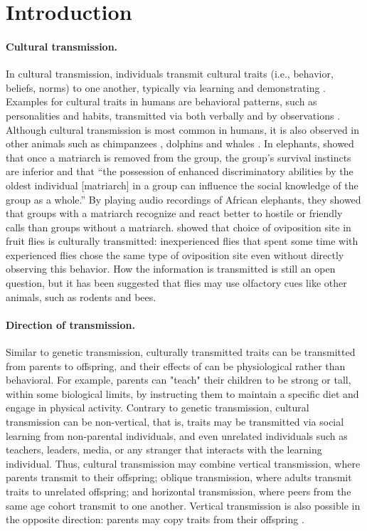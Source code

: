 \documentclass[12pt]{extarticle}
\begin{document}
\tableofcontents

\pagebreak

\section{Introduction}

\paragraph{Cultural transmission.}
In cultural transmission, individuals transmit cultural traits (i.e., behavior, beliefs, norms) to one another, typically via learning and demonstrating \citep{transmissionVectorsBook}.
Examples for cultural traits in humans are behavioral patterns, such as personalities and habits, transmitted via both verbally and by observations \citep{cultural_traits}. 
Although cultural transmission is most common in humans, it is also observed in other animals such as chimpanzees \citep{chimpsPrestige, chimpsCopy}, dolphins and whales \citep{dolphins_whales}.
In elephants, \citet{elepahntsRepo} showed that once a matriarch is removed from the group, the group's survival instincts are inferior and that ``the possession of enhanced discriminatory abilities by the oldest individual [matriarch] in a group can influence the social knowledge of the group as a whole.''
By playing audio recordings of African elephants, they showed that groups with a matriarch recognize and react better to hostile or friendly calls than groups without a matriarch.
\citet{fliesPaper} showed that choice of oviposition site in fruit flies is culturally transmitted: inexperienced flies that spent some time with experienced flies chose the same type of oviposition site even without directly observing this behavior. How the information is transmitted is still an open question, but it has been suggested that flies may use olfactory cues like other animals, such as rodents and bees.

\paragraph{Direction of transmission.}
Similar to genetic transmission, culturally transmitted traits can be transmitted from parents to offspring, and their effects of can be physiological rather than behavioral.
For example, parents can "teach" their children to be strong or tall, within some biological limits, by instructing them to maintain a specific diet and engage in physical activity.
Contrary to genetic transmission, cultural transmission can be non-vertical, that is, traits may be transmitted via social learning from non-parental individuals, and even unrelated individuals such as teachers, leaders, media, or any stranger that interacts with the learning individual.
Thus, cultural transmission may combine vertical transmission, where parents transmit to their offspring; oblique transmission, where adults transmit traits to unrelated offspring; and horizontal transmission, where peers from the same age cohort transmit to one another. 
Vertical transmission is also possible in the opposite direction: parents may copy traits from their offspring \citep{transmissionVectorsBook,transmissionVectors}.
\end{document}

